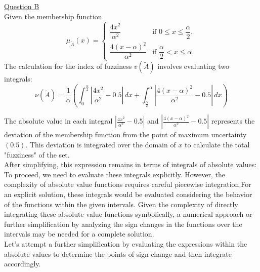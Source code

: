\underline{Question B}\\
Given the membership function 
\begin{equation}
	\mu_{\tilde{A}}(x) = 
		 \begin{cases} 
			\dfrac{4x^2}{\alpha^2} & \text{if } 0 \leq x \leq \dfrac{\alpha}{2}, \\
			
			\dfrac{4(x-\alpha)^2}{\alpha^2} & \text{if } \dfrac{\alpha}{2} < x \leq \alpha.
		\end{cases}
\end{equation}
The calculation for the index of fuzziness $v(\tilde{A})$ involves evaluating two integrals:
\begin{equation}
	\nu(\tilde{A}) = \frac{1}{\alpha} \left( \int_{0}^{\frac{\alpha}{2}} \left| \frac{4x^2}{\alpha^2} - 0.5 \right| \, dx + \int_{\frac{\alpha}{2}}^{\alpha} \left| \frac{4(x-\alpha)^2}{\alpha^2} - 0.5 \right| \, dx \right)
\end{equation}
\label{eq:main_eq}

The absolute value in each integral $\left| \frac{4x^2}{\alpha^2} - 0.5 \right|$ and $\left| \frac{4(x-\alpha)^2}{\alpha^2} - 0.5 \right|$
represents the deviation of the membership function from the point of maximum uncertainty $(0.5)$. This deviation is integrated over the domain of $x$ to calculate the total "fuzziness" of the set.\\

After simplifying, this expression remains in terms of integrals of absolute values:
To proceed, we need to evaluate these integrals explicitly. However, the complexity of absolute value functions requires careful piecewise integration.For an explicit solution, these integrals would be evaluated considering the behavior of the functions within the given intervals. Given the complexity of directly integrating these absolute value functions symbolically, a numerical approach or further simplification by analyzing the sign changes in the functions over the intervals may be needed for a complete solution.\\

Let's attempt a further simplification by evaluating the expressions within the absolute values to determine the points of sign change and then integrate accordingly. ​\\

